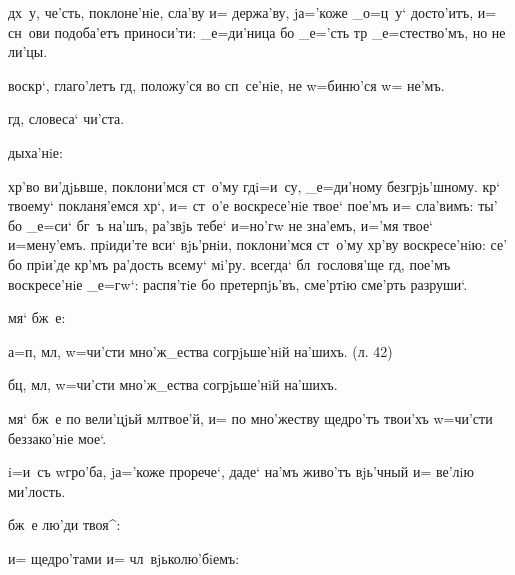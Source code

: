   дх~у, че'сть, поклоне'нiе, сла'ву и= 
держа'ву, jа='коже _о=ц~у` досто'итъ, и= сн~ови 
подоба'етъ приноси'ти: _е=ди'ница бо _е='сть тр 
_е=стество'мъ, но не ли'цы.



 воскр`, глаго'летъ гд, положу'ся во 
сп~се'нiе, не w=биню'ся w= не'мъ.

  гд, словеса` чи'ста.

 дыха'нiе: 

 хр'во ви'дjьвше, поклони'мся ст~о'му 
гд i=и~су, _е=ди'ному безгрjь'шному. кр` твоему` 
покланя'емся хр`, и= ст~о'е воскресе'нiе твое` пое'мъ 
и= сла'вимъ: ты' бо _е=си` бг~ъ на'шъ, ра'звjь тебе` 
и=но'гw не зна'емъ, и='мя твое` и=мену'емъ. прiиди'те 
вси` вjь'рнiи, поклони'мся ст~о'му хр'ву 
воскресе'нiю: се' бо прiи'де кр'мъ ра'дость всему` 
мi'ру. всегда` бл~гословя'ще гд, пое'мъ воскресе'нiе 
_е=гw`: распя'тiе бо претерпjь'въ, сме'ртiю сме'рть 
разруши`.

   мя` бж~е: 

  а=п, мл, w=чи'сти 
мно'ж_ества согрjьше'нiй на'шихъ. (л. 42)

   бц, мл, w=чи'сти 
мно'ж_ества согрjьше'нiй на'шихъ.

    мя` бж~е по вели'цjьй 
мл твое'й, и= по мно'жеству щедро'тъ твои'хъ w=чи'сти 
беззако'нiе мое`.

   i=и~съ w\т гро'ба, 
jа='коже прорече`, даде` на'мъ живо'тъ вjь'чный и= ве'лiю 
ми'лость.

 бж~е лю'ди твоя^:

   и= щедро'тами и= 
чл~вjьколю'бiемъ:


